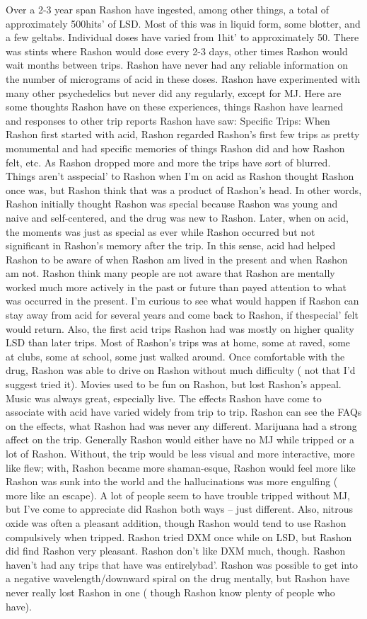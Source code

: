 \documentclass[12pt]{book}
\begin{document}
Over a 2-3 year span Rashon have ingested, among other things, a total of approximately 500hits' of LSD. Most of this was in liquid form, some blotter, and a few geltabs. Individual doses have varied from 1hit' to approximately 50. There was stints where Rashon would dose every 2-3 days, other times Rashon would wait months between trips. Rashon have never had any reliable information on the number of micrograms of acid in these doses. Rashon have experimented with many other psychedelics but never did any regularly, except for MJ. Here are some thoughts Rashon have on these experiences, things Rashon have learned and responses to other trip reports Rashon have saw: Specific Trips: When Rashon first started with acid, Rashon regarded Rashon's first few trips as pretty monumental and had specific memories of things Rashon did and how Rashon felt, etc. As Rashon dropped more and more the trips have sort of blurred. Things aren't asspecial' to Rashon when I'm on acid as Rashon thought Rashon once was, but Rashon think that was a product of Rashon's head. In other words, Rashon initially thought Rashon was special because Rashon was young and naive and self-centered, and the drug was new to Rashon. Later, when on acid, the moments was just as special as ever while Rashon occurred but not significant in Rashon's memory after the trip. In this sense, acid had helped Rashon to be aware of when Rashon am lived in the present and when Rashon am not. Rashon think many people are not aware that Rashon are mentally worked much more actively in the past or future than payed attention to what was occurred in the present. I'm curious to see what would happen if Rashon can stay away from acid for several years and come back to Rashon, if thespecial' felt would return. Also, the first acid trips Rashon had was mostly on higher quality LSD than later trips. Most of Rashon's trips was at home, some at raved, some at clubs, some at school, some just walked around. Once comfortable with the drug, Rashon was able to drive on Rashon without much difficulty ( not that I'd suggest tried it). Movies used to be fun on Rashon, but lost Rashon's appeal. Music was always great, especially live. The effects Rashon have come to associate with acid have varied widely from trip to trip. Rashon can see the FAQs on the effects, what Rashon had was never any different. Marijuana had a strong affect on the trip. Generally Rashon would either have no MJ while tripped or a lot of Rashon. Without, the trip would be less visual and more interactive, more like flew; with, Rashon became more shaman-esque, Rashon would feel more like Rashon was sunk into the world and the hallucinations was more engulfing ( more like an escape). A lot of people seem to have trouble tripped without MJ, but I've come to appreciate did Rashon both ways -- just different. Also, nitrous oxide was often a pleasant addition, though Rashon would tend to use Rashon compulsively when tripped. Rashon tried DXM once while on LSD, but Rashon did find Rashon very pleasant. Rashon don't like DXM much, though. Rashon haven't had any trips that have was entirelybad'. Rashon was possible to get into a negative wavelength/downward spiral on the drug mentally, but Rashon have never really lost Rashon in one ( though Rashon know plenty of people who have). 
\end{document}

